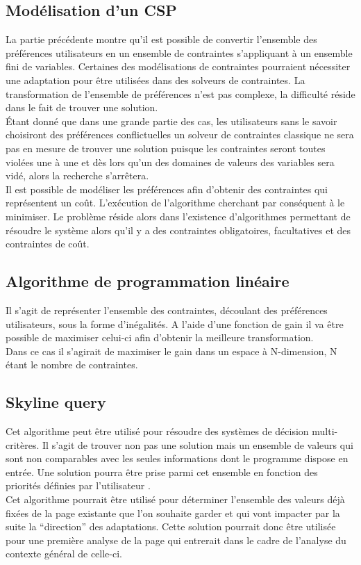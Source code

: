 \documentclass[french,a4paper]{report}
\begin{document}
{\subsection{Modélisation d'un CSP}
La partie précédente montre qu'il est possible de convertir l'ensemble des
préférences utilisateurs en un ensemble de contraintes s'appliquant à un ensemble
fini de variables. Certaines des modélisations de contraintes pourraient
nécessiter une adaptation pour être utilisées dans des solveurs de contraintes.
La transformation de l'ensemble de préférences n'est pas complexe, la difficulté
réside dans
le fait de trouver une solution.\\
Étant donné que dans une grande partie des cas, les utilisateurs sans le savoir
choisiront des préférences conflictuelles un solveur de contraintes classique ne
sera pas en mesure de trouver une solution puisque les contraintes seront toutes
violées une à une et dès lors qu'un des
domaines de valeurs des variables sera vidé, alors la recherche s'arrêtera.\\
Il est possible de modéliser les préférences afin d'obtenir des contraintes qui
représentent un coût. L'exécution de l'algorithme cherchant par conséquent à le
minimiser. Le problème réside alors dans l'existence d'algorithmes permettant de
résoudre le système alors qu'il y a des contraintes obligatoires, facultatives et
des contraintes de coût.
\subsection{Algorithme de programmation linéaire}
Il s'agit de représenter l'ensemble des contraintes, découlant des préférences
utilisateurs, sous la forme d'inégalités. A l'aide d'une fonction de gain il va
être possible de maximiser
celui-ci afin d'obtenir la meilleure transformation.\\
Dans ce cas il s'agirait de maximiser le gain dans un espace à N-dimension, N
étant le nombre de contraintes.
\subsection{Skyline query}
Cet algorithme peut être utilisé pour résoudre des systèmes de décision
multi-critères. Il s'agit de trouver non pas une solution mais un ensemble de
valeurs qui sont non comparables avec les seules informations dont le programme
dispose en entrée. Une solution pourra être prise parmi cet
ensemble en fonction des priorités définies par l'utilisateur \cite{skyline}.\\
Cet algorithme pourrait être utilisé pour déterminer l'ensemble des valeurs déjà
fixées de la page existante que l'on souhaite garder et qui vont impacter par la
suite la \enquote{direction} des adaptations. Cette solution pourrait donc être utilisée
pour une première analyse de la page qui entrerait dans le cadre de l'analyse du
contexte général de celle-ci.
\newpage
}
\end{document}

